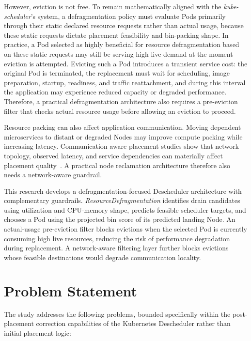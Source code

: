 However, eviction is not free. To remain mathematically aligned with the \textit{kube-scheduler}'s system, a defragmentation policy must evaluate Pods primarily through their static declared resource requests rather than actual usage, because these static requests dictate placement feasibility and bin-packing shape. In practice, a Pod selected as highly beneficial for resource defragmentation based on these static requests may still be serving high live demand at the moment eviction is attempted. Evicting such a Pod introduces a transient service cost: the original Pod is terminated, the replacement must wait for scheduling, image preparation, startup, readiness, and traffic reattachment, and during this interval the application may experience reduced capacity or degraded performance. Therefore, a practical defragmentation architecture also requires a pre-eviction filter that checks actual resource usage before allowing an eviction to proceed.

Resource packing can also affect application communication. Moving dependent microservices to distant or degraded Nodes may improve compute packing while increasing latency. Communication-aware placement studies show that network topology, observed latency, and service dependencies can materially affect placement quality~\citep{marchese2022network,marchese_tomarchio_2022,chen2024trade}. A practical node reclamation architecture therefore also needs a network-aware guardrail.

This research develops a defragmentation-focused Descheduler architecture with complementary guardrails. \textit{ResourceDefragmentation} identifies drain candidates using utilization and CPU-memory shape, predicts feasible scheduler targets, and chooses a Pod using the projected bin score of its predicted landing Node. An actual-usage pre-eviction filter blocks evictions when the selected Pod is currently consuming high live resources, reducing the risk of performance degradation during replacement. A network-aware filtering layer further blocks evictions whose feasible destinations would degrade communication locality.

\section{Problem Statement}
\label{sec:problemStatement}

The study addresses the following problems, bounded specifically within the post-placement correction capabilities of the Kubernetes Descheduler rather than initial placement logic:

